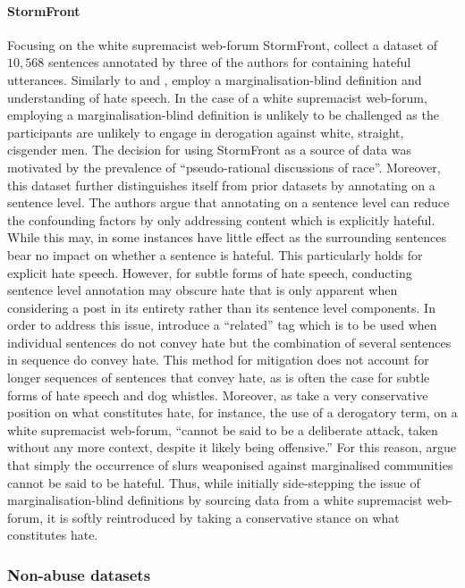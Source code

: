 \paragraph*{StormFront} Focusing on the white supremacist web-forum StormFront, \citet{Garcia:2019} collect a dataset of $10,568$ sentences annotated by three of the authors for containing hateful utterances. 
Similarly to \citet{Davidson:2017} and \citet{Wulczyn:2016}, \citet{Garcia:2019} employ a marginalisation-blind definition and understanding of hate speech. 
In the case of a white supremacist web-forum, employing a marginalisation-blind definition is unlikely to be challenged as the participants are unlikely to engage in derogation against white, straight, cisgender men.
The decision for using StormFront as a source of data was motivated by the prevalence of ``pseudo-rational discussions of race''.
Moreover, this dataset further distinguishes itself from prior datasets by annotating on a sentence level.
The authors argue that annotating on a sentence level can reduce the confounding factors by only addressing content which is explicitly hateful.
While this may, in some instances have little effect as the surrounding sentences bear no impact on whether a sentence is hateful. This particularly holds for explicit hate speech.
However, for subtle forms of hate speech, conducting sentence level annotation may obscure hate that is only apparent when considering a post in its entirety rather than its sentence level components. In order to address this issue, \citet{Garcia:2019} introduce a ``related'' tag which is to be used when individual sentences do not convey hate but the combination of several sentences in sequence do convey hate.
This method for mitigation does not account for longer sequences of sentences that convey hate, as is often the case for subtle forms of hate speech and dog whistles.
Moreover, as \citet{Garcia:2019} take a very conservative position on what constitutes hate, for instance, the use of a derogatory term, on a white supremacist web-forum, ``cannot be said to be a deliberate attack, taken without any more context, despite it likely being offensive.'' For this reason, \citet{Garcia:2019} argue that simply the occurrence of slurs weaponised against marginalised communities cannot be said to be hateful.
Thus, while initially side-stepping the issue of marginalisation-blind definitions by sourcing data from a white supremacist web-forum, it is softly reintroduced by taking a conservative stance on what constitutes hate.

\subsubsection{Non-abuse datasets}\label{sec:mtl_data}

